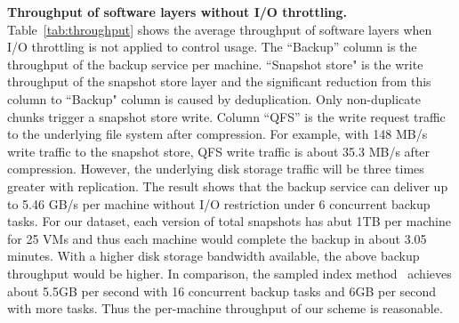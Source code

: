 {\bf Throughput of software layers without I/O throttling.}
Table~\ref{tab:throughput} shows the  average throughput of software layers
when I/O throttling is not applied to control usage. The
``Backup'' column is the throughput  of the backup service  per machine.
``Snapshot store" is the  write throughput of the snapshot store layer and the significant reduction from this
column to  ``Backup" column is caused by deduplication.
Only non-duplicate chunks trigger a snapshot store write.
Column ``QFS'' is the write request traffic to the underlying file system after compression.
For example, with 148 MB/s write traffic to the snapshot store, QFS write traffic is about 35.3 MB/s
after compression.  However, the underlying disk storage traffic will be three times greater with replication.
The result shows that the backup service can deliver up to 5.46 GB/s 
per machine without I/O restriction
under 6 concurrent backup tasks. 
For our dataset, each version of total snapshots has abut 1TB per machine for 25 VMs and  thus  each machine
would complete the backup in about 3.05 minutes.
With a higher disk storage bandwidth available, the above backup
throughput would be higher. 
In comparison, the sampled index method~\cite{Guo2011} achieves about 5.5GB per second
with 16 concurrent backup tasks and 6GB per second with
more tasks.  Thus the per-machine throughput of our scheme is reasonable.
 



